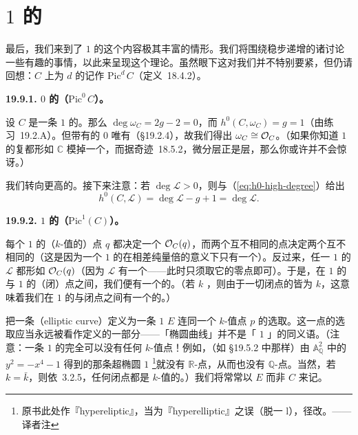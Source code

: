 
\section{\trGenus{} $1$ 的\trCurve}

最后，我们来到了\trGenus{} $1$ 的\trCurve{}这个内容极其丰富的情形。我们将围绕\trDegree{}稳步递增的诸\trLineBundle{}讨论一些有趣的事情，以此来呈现这个理论。虽然眼下这对我们并不特别要紧，但仍请回想：$C$ 上\trDegree{}为 $d$ 的\trLineBundle{}记作 $\mathrm{Pic}^d\,C$（\mbox{定义~18.4.2}）。

\textbf{19.9.1. \trDegree{} $0$ 的\trLineBundle{}（$\mathrm{Pic}^0\,C$）。}

设 $C$ 是一条\trGenus{} $1$ 的\trCurve。那么 $\deg\omega_C=2g-2=0$，而 $h^0(C,\omega_C)=g=1$（由\mbox{练习~19.2.A}）。但带有\trSection{}的\trDegree{} $0$ \trInvertibleSheaf{}唯有\trStructureSheaf{}（\S19.2.4），故我们得出 $\omega_C\cong\mathcal{O}_C$。（如果你知道\trGenus{} $1$ 的复\trCurve{}都形如 $\mathbb{C}$ 模掉一个\trLattice，而据\mbox{奇迹~18.5.2}，微分层正是\trCanonical{}层，那么你或许并不会惊讶。）

我们转向\trDegree{}更高的\trLineBundle。接下来注意：若 $\deg\mathscr{L}>0$，则\trRiemannRoch{}与\trSerreDuality（\eqref{eq:h0-high-degree}）给出
\[
h^0(C,\mathscr{L})=\deg\mathscr{L}-g+1=\deg\mathscr{L}.
\]

\textbf{19.9.2. \trDegree{} $1$ 的\trLineBundle{}（$\mathrm{Pic}^1(C)$）。}

每个\trDegree{} $1$ 的（$k$-值的）点 $q$ 都决定一个\trLineBundle{} $\mathcal{O}_C(q)$，而两个互不相同的点决定两个互不相同的\trLineBundle（这是因为一个\trDegree{} $1$ 的\trLineBundle{}在相差纯量倍的意义下只有一个\trSection）。反过来，任一\trDegree{} $1$ 的\trLineBundle{} $\mathscr{L}$ 都形如 $\mathcal{O}_C(q)$（因为 $\mathscr{L}$ 有一个\trSection——此时只须取它的零点\trDivisor{}即可）。于是，在\trDegree{} $1$ 的\trLineBundle{}与\trDegree{} $1$ 的（闭）点之间，我们便有一个\trCanonical{}的\trBijection。（若 $k$ \trAlgClosed，则由于一切闭点的\trResidueField{}皆为 $k$，这意味着我们在\trDegree{} $1$ 的\trLineBundle{}与闭点之间有一个\trCanonical{}的\trBijection。）

把一条\textbf{\trEllipticCurve}（elliptic curve）定义为一条\trGenus{} $1$ \trCurve{} $E$ 连同一个 $k$-值点 $p$ 的选取。这一点的选取应当永远被看作\trEllipticCurve{}定义的一部分——「椭圆曲线」并不是「\trGenus{} $1$ \trCurve」的同义语。（注意：一条\trGenus{} $1$ 的\trCurve{}完全可以没有任何 $k$-值点！例如，（如 \S19.5.2 中那样）由 $\mathbb{A}^2_{\mathbb{Q}}$ 中的 $y^2=-x^4-1$ 得到的那条超椭圆\trGenus{} $1$ \trCurve\footnote{原书此处作『hypereliptic』，当为『hyperelliptic』之误（脱一 l），径改。——译者注}就没有 $\mathbb{R}$-点，从而也没有 $\mathbb{Q}$-点。当然，若 $k=\bar{k}$，则依\mbox{\trNullstellensatz~3.2.5}，任何闭点都是 $k$-值的。）我们将常常以 $E$ 而非 $C$ 来记\trEllipticCurve。

